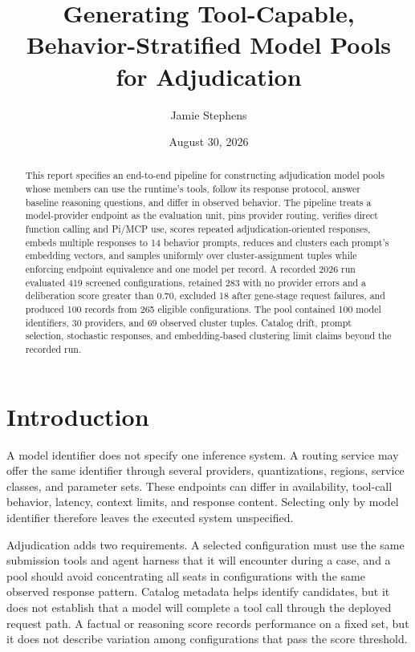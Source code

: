 \documentclass[11pt]{article}
\title{Generating Tool-Capable, Behavior-Stratified Model Pools for Adjudication}
\author{Jamie Stephens}
\date{August 30, 2026}
\begin{document}
\maketitle

\begin{abstract}
This report specifies an end-to-end pipeline for constructing adjudication model pools whose members can use the runtime's tools, follow its response protocol, answer baseline reasoning questions, and differ in observed behavior.  The pipeline treats a model-provider endpoint as the evaluation unit, pins provider routing, verifies direct function calling and Pi/MCP use, scores repeated adjudication-oriented responses, embeds multiple responses to 14 behavior prompts, reduces and clusters each prompt's embedding vectors, and samples uniformly over cluster-assignment tuples while enforcing endpoint equivalence and one model per record.  A recorded 2026 run evaluated 419 screened configurations, retained 283 with no provider errors and a deliberation score greater than 0.70, excluded 18 after gene-stage request failures, and produced 100 records from 265 eligible configurations.  The pool contained 100 model identifiers, 30 providers, and 69 observed cluster tuples.  Catalog drift, prompt selection, stochastic responses, and embedding-based clustering limit claims beyond the recorded run.
\end{abstract}

\section{Introduction}

A model identifier does not specify one inference system.  A routing service may offer the same identifier through several providers, quantizations, regions, service classes, and parameter sets.  These endpoints can differ in availability, tool-call behavior, latency, context limits, and response content.  Selecting only by model identifier therefore leaves the executed system unspecified.

Adjudication adds two requirements.  A selected configuration must use the same submission tools and agent harness that it will encounter during a case, and a pool should avoid concentrating all seats in configurations with the same observed response pattern.  Catalog metadata helps identify candidates, but it does not establish that a model will complete a tool call through the deployed request path.  A factual or reasoning score records performance on a fixed set, but it does not describe variation among configurations that pass the score threshold.
\end{document}
